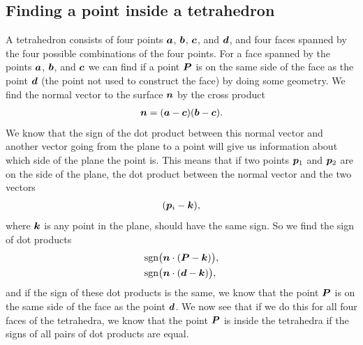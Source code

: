 \subsection{Finding a point inside a tetrahedron}
A tetrahedron consists of four points $\boldsymbol{a}$, $\boldsymbol{b}$, $\boldsymbol{c}$, and $\boldsymbol{d}$, and four faces spanned by the four possible combinations of the four points. For a face spanned by the points $\boldsymbol{a}$, $\boldsymbol{b}$, and $\boldsymbol{c}$ we can find if a point $\boldsymbol{P}$ is on the same side of the face as the point $\boldsymbol{d}$ (the point not used to construct the face) by doing some geometry. We find the normal vector to the surface $\boldsymbol{n}$ by the cross product 
\begin{align*}
    \boldsymbol{n} = (\boldsymbol{a}-\boldsymbol{c})(\boldsymbol{b}-\boldsymbol{c}).
\end{align*}
We know that the sign of the dot product between this normal vector and another vector going from the plane to a point will give us information about which side of the plane the point is. This means that if two points $\boldsymbol{p}_1$ and $\boldsymbol{p}_2$ are on the side of the plane, the dot product between the normal vector and the two vectors
\begin{align*}
    (\boldsymbol{p}_i - \boldsymbol{k}),
\end{align*}
where $\boldsymbol{k}$ is any point in the plane, should have the same sign. So we find the sign of dot products
\begin{align*}
    &\text{sgn}\big(\boldsymbol{n}\cdot(\boldsymbol{P} - \boldsymbol{k})\big), \\
    &\text{sgn}\big(\boldsymbol{n}\cdot(\boldsymbol{d} - \boldsymbol{k})\big),
\end{align*}
and if the sign of these dot products is the same, we know that the point $\boldsymbol{P}$ is on the same side of the face as the point $\boldsymbol{d}$. We now see that if we do this for all four faces of the tetrahedra, we know that the point $\boldsymbol{P}$ is inside the tetrahedra if the signs of all pairs of dot products are equal.

